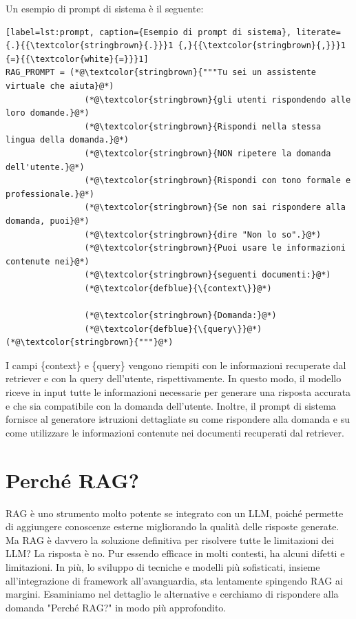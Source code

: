 Un esempio di prompt di sistema è il seguente:
\begin{lstlisting}[label=lst:prompt, caption={Esempio di prompt di sistema}, literate={.}{{\textcolor{stringbrown}{.}}}1 {,}{{\textcolor{stringbrown}{,}}}1 {=}{{\textcolor{white}{=}}}1]
RAG_PROMPT = (*@\textcolor{stringbrown}{"""Tu sei un assistente virtuale che aiuta}@*)
                (*@\textcolor{stringbrown}{gli utenti rispondendo alle loro domande.}@*)
                (*@\textcolor{stringbrown}{Rispondi nella stessa lingua della domanda.}@*)
                (*@\textcolor{stringbrown}{NON ripetere la domanda dell'utente.}@*)
                (*@\textcolor{stringbrown}{Rispondi con tono formale e professionale.}@*)
                (*@\textcolor{stringbrown}{Se non sai rispondere alla domanda, puoi}@*)
                (*@\textcolor{stringbrown}{dire "Non lo so".}@*)
                (*@\textcolor{stringbrown}{Puoi usare le informazioni contenute nei}@*)
                (*@\textcolor{stringbrown}{seguenti documenti:}@*)
                (*@\textcolor{defblue}{\{context\}}@*)
                
                (*@\textcolor{stringbrown}{Domanda:}@*)
                (*@\textcolor{defblue}{\{query\}}@*)(*@\textcolor{stringbrown}{"""}@*)
\end{lstlisting}
I campi \{context\} e \{query\} vengono riempiti con le informazioni recuperate dal retriever e con la query dell'utente, rispettivamente. In questo modo, il modello riceve in input tutte le informazioni necessarie per generare una risposta accurata e che sia compatibile con la domanda dell'utente. Inoltre, il prompt di sistema fornisce al generatore istruzioni dettagliate su come rispondere alla domanda e su come utilizzare le informazioni contenute nei documenti recuperati dal retriever.

\section{Perché RAG?}
RAG è uno strumento molto potente se integrato con un LLM, poiché permette di aggiungere conoscenze esterne migliorando la qualità delle risposte generate. Ma RAG è davvero la soluzione definitiva per risolvere tutte le limitazioni dei LLM? La risposta è no. Pur essendo efficace in molti contesti, ha alcuni difetti e limitazioni. In più, lo sviluppo di tecniche e modelli più sofisticati, insieme all'integrazione di framework all'avanguardia, sta lentamente spingendo RAG ai margini. Esaminiamo nel dettaglio le alternative e cerchiamo di rispondere alla domanda "Perché RAG?" in modo più approfondito.

